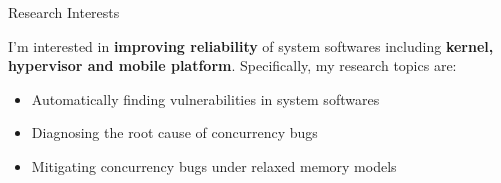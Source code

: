 \begin{rSection}{Research Interests}
\newcommand{\eg}{\textit{e}.\textit{g}.\xspace}

  I'm interested in \textbf{improving reliability} of system softwares
  including \textbf{kernel, hypervisor and mobile
    platform}. Specifically, my research topics are:
  \begin{itemize}[leftmargin=*,itemsep=-5pt]
  \item{Automatically finding vulnerabilities in system softwares}
  \item{Diagnosing the root cause of concurrency bugs}
  \item{Mitigating concurrency bugs under relaxed memory models}
  \end{itemize}

\end{rSection}
